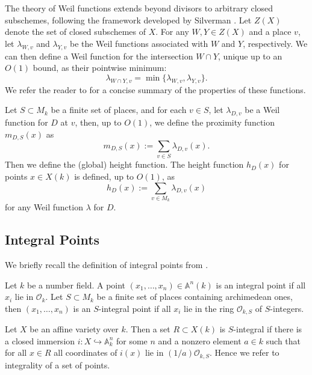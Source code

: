\documentclass[10pt]{amsart}
\numberwithin{equation}{section}
\theoremstyle{plain}
\theoremstyle{definition}
\begin{document}
The theory of Weil functions extends beyond divisors to arbitrary closed subschemes, following the framework developed by Silverman \cite{Sil1987}. Let $Z(X)$ denote the set of closed subschemes of $X$. For any $W, Y \in Z(X)$ and a place $v$, let $\lambda_{W,v}$ and $\lambda_{Y,v}$ be the Weil functions associated with $W$ and $Y$, respectively. We can then define a Weil function for the intersection $W \cap Y$, unique up to an $O(1)$ bound, as their pointwise minimum:
\begin{equation*}
    \lambda_{W\cap Y,v} = \min\{\lambda_{W,v}, \lambda_{Y,v}\}.
\end{equation*}
We refer the reader to \cite[Theorem 2.1]{HLX} for a concise summary of the properties of these functions.


Let $S \subset M_k$ be a finite set of places, and for each $v \in S$, let $\lambda_{D,v}$ be a Weil function for $D$ at $v$, then, up to $O(1)$, we define the proximity function $m_{D,S}(x)$ as
\begin{equation*}
    m_{D,S}(x):=\sum_{v \in S}\lambda_{D,v}(x).
\end{equation*}
Then we define the (global) height function. The height function $h_{D}(x)$ for points $x \in X(k)$ is defined, up to $O(1)$, as
\begin{equation*}
    h_D(x):=\sum_{v \in M_k}\lambda_{D,v}(x)
\end{equation*}
for any Weil function $\lambda$ for $D$.



\subsection{Integral Points}
We briefly recall the definition of integral points from \cite[Section 13]{VojtaBook}.

Let $k$ be a number field. A point $(x_1,\ldots,x_n) \in \mathbb{A}^n(k)$ is an integral point if all $x_i$ lie in $\mathcal{O}_k$. Let $S \subset M_k$ be a finite set of places containing archimedean ones, then $(x_1,\ldots,x_n)$ is an $S$-integral point if all $x_i$ lie in the ring $\mathcal{O}_{k,S}$ of $S$-integers.

Let $X$ be an affine variety over $k$. Then a set $R \subset X(k)$ is $S$-integral if there is a closed immersion $i: X \hookrightarrow \mathbb{A}^n_k$ for some $n$ and a nonzero element $a \in k$ such that for all $x \in R$ all coordinates of $i(x)$ lie in $(1/a)\mathcal{O}_{k,S}$. Hence we refer to integrality of a set of points.
\end{document}
